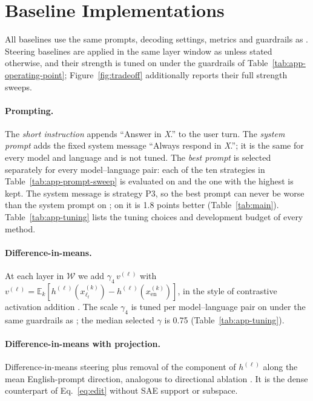 \FloatBarrier
\section{Baseline Implementations}
\label{app:baselines}

All baselines use the same prompts, decoding settings, metrics and guardrails as \foxp. Steering baselines are applied in the same layer window as \foxp unless stated otherwise, and their strength is tuned on \Ddev under the guardrails of Table~\ref{tab:app-operating-point}; Figure~\ref{fig:tradeoff} additionally reports their full strength sweeps.

\paragraph{Prompting.}
The \emph{short instruction} appends ``Answer in \textit{X}.'' to the user turn. The \emph{system prompt} adds the fixed system message ``Always respond in \textit{X}.''; it is the same for every model and language and is not tuned. The \emph{best prompt} is selected separately for every model--language pair: each of the ten strategies in Table~\ref{tab:app-prompt-sweep} is evaluated on \Ddev and the one with the highest  is kept. The system message is strategy P3, so the best prompt can never be worse than the system prompt on \Ddev; on \Deval it is 1.8 points better (Table~\ref{tab:main}). Table~\ref{tab:app-tuning} lists the tuning choices and development budget of every method.

\paragraph{Difference-in-means.}
At each layer in $\mathcal{W}$ we add $\gamma_4\,v^{(\ell)}$ with $v^{(\ell)}=\mathbb{E}_k[h^{(\ell)}(x^{(k)}_{\ell_t})-h^{(\ell)}(x^{(k)}_{\mathrm{en}})]$, in the style of contrastive activation addition \citep{rimsky-etal-2024-steering}. The scale $\gamma_4$ is tuned per model--language pair on \Ddev under the same guardrails as \foxp; the median selected $\gamma$ is 0.75 (Table~\ref{tab:app-tuning}).

\paragraph{Difference-in-means with projection.}
Difference-in-means steering plus removal of the component of $h^{(\ell)}$ along the mean English-prompt direction, analogous to directional ablation \citep{arditi2024refusal}. It is the dense counterpart of Eq.~\ref{eq:edit} without SAE support or subspace.


